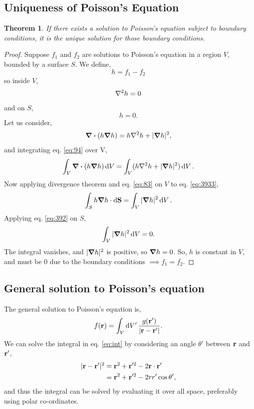 \documentclass{book}
\newtheorem*{theorem}{Theorem}
\begin{document}
\subsection{Uniqueness of Poisson's Equation}
\begin{theorem}
	If there exists a solution to Poisson's equation subject to boundary conditions, it is the unique solution for those boundary conditions.
\end{theorem}
\begin{proof}
	Suppose $f_1$ and $f_2$ are solutions to Poisson's equation in a region $V$, bounded by a surface $S$. We define,
	\begin{equation}
		h = f_1 - f_2
	\end{equation}
	so inside $V$,
	\begin{equation}
		\laplacian{h} = 0 \label{eq:83}
	\end{equation}
	and on $S$,
	\begin{equation}
		h = 0. \label{eq:392}
	\end{equation}
	Let us consider,
	\begin{equation}
		\div{(h\grad h)} = h\laplacian h  + |\grad h|^2, \label{eq:94}
	\end{equation}
	and integrating eq. \eqref{eq:94} over V,
	\begin{equation}
		\int_V\div{(h\grad h)}\dd{V} = \int_V(h\laplacian h  + |\grad h|^2)\dd{V}. \label{eq:3933}
	\end{equation}
	Now applying divergence theorem and eq. \eqref{eq:83} on $V$ to eq. \eqref{eq:3933},
	\begin{equation}
		\int_S h\grad h \cdot \dd{\vb{S}} = \int_V |\grad h|^2\dd{V}.
	\end{equation}
	Applying eq. \eqref{eq:392} on $S$, 
	\begin{equation}
		\int_V|\grad h|^2 \dd{V} = 0.
	\end{equation}
	The integral vanishes, and $|\grad h|^2$ is positive, so $\grad h = 0$. So, $h$ is constant in $V$, and must be $0$ due to the boundary conditions $\implies f_1 = f_2$.
\end{proof}
\subsection{General solution to Poisson's equation}
The general solution to Poisson's equation is,
\begin{equation}
	f(\vb{r}) = \int_V\dd{V'}\frac{g(\vb{r'})}{|\vb{r}-\vb{r}'|}. \label{eq:int}
\end{equation}
We can solve the integral in eq. \eqref{eq:int} by considering an angle $\theta'$ between $\vb{r}$ and $\vb{r}'$,
\begin{equation}
\begin{split}
	|\vb{r} - \vb{r}'|^2 & = \vb{r}^2 + \vb{r}'^2 - 2\vb{r}\cdot\vb{r}'\\
	& = \vb{r}^2 + \vb{r}'^2  - 2rr'\cos{\theta'},
\end{split}
\end{equation}
and thus the integral can be solved by evaluating it over all space, preferably using polar co-ordinates.
\end{document}
